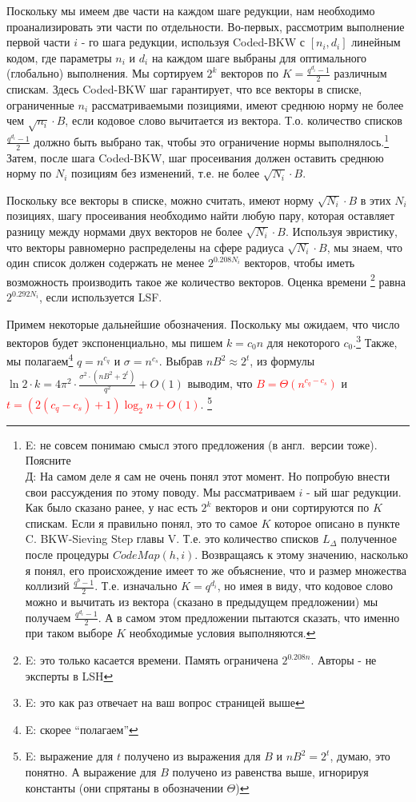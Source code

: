 \documentclass[a4paper,11pt]{article}
\begin{document}
Поскольку мы имеем две части на каждом шаге редукции, нам необходимо проанализировать эти части по отдельности. Во-первых, рассмотрим выполнение первой части $i$ - го шага редукции, используя Coded-BKW с $[n_i,d_i]$ линейным кодом, где параметры $n_i$ и $d_i$ на каждом шаге выбраны для оптимального (глобально) выполнения. Мы сортируем $2^k$ векторов по $K=\frac{q^{d_i} - 1}{2}$ различным спискам. Здесь Coded-BKW шаг гарантирует, что все векторы в списке, ограниченные $n_i$ рассматриваемыми позициями, имеют среднюю норму не более чем $\sqrt{n_i}\cdot B$, если кодовое слово вычитается из вектора. Т.о. количество списков $\frac{q^{d_i} - 1}{2}$ должно быть выбрано так, чтобы это ограничение нормы выполнялось.\footnote{E: не совсем понимаю смысл этого предложения (в англ.\ версии тоже). Поясните \\ Д: На самом деле я сам не очень понял этот момент. Но попробую внести свои рассуждения по этому поводу. Мы рассматриваем $i$ - ый шаг редукции. Как было сказано ранее, у нас есть $2^k$ векторов и они сортируются по $K$ спискам. Если я правильно понял, это то самое $K$ которое описано в пункте C. BKW-Sieving Step главы V. Т.е. это количество списков $L_{\Delta}$ полученное после процедуры $CodeMap(h,i)$. Возвращаясь к этому значению, насколько я понял, его происхождение имеет то же объяснение, что и размер множества коллизий $\frac{q^b-1}{2}$. Т.е. изначально $K=q^{d_i}$, но имея в виду, что кодовое слово можно и вычитать из вектора (сказано в предыдущем предложении) мы получаем $\frac{q^{d_i}-1}{2}$. А в самом этом предложении пытаются сказать, что именно при таком выборе $K$ необходимые условия выполняются.} Затем, после шага Coded-BKW, шаг просеивания должен оставить среднюю норму по $N_i$ позициям без изменений, т.е. не более $\sqrt{N_i}\cdot B$.

Поскольку все векторы в списке, можно считать, имеют норму $\sqrt{N_i}\cdot B$ в этих $N_i$ позициях, шагу просеивания необходимо найти любую пару, которая оставляет разницу между нормами двух векторов не более $\sqrt{N_i}\cdot B$. Используя эвристику, что векторы равномерно распределены на сфере радиуса $\sqrt{N_i}\cdot B$, мы знаем, что один список должен содержать не менее $2^{0.208N_i }$ векторов, чтобы иметь возможность производить такое же количество векторов. Оценка времени \footnote{E: это только касается времени. Память ограничена $2^{0.208n }$. Авторы - не эксперты в LSH} равна $2^{0.292N_i}$, если используется LSF.

Примем некоторые дальнейшие обозначения. Поскольку мы ожидаем, что число векторов будет экспоненциально, мы пишем $k=c_0n$ для некоторого $c_0$.\footnote{E: это как раз отвечает на ваш вопрос страницей выше} Также, мы полагаем\footnote{E: скорее ``полагаем''} $q=n^{c_q}$ и $\sigma=n^{c_s}$. Выбрав $nB^2\approx2^t$, из формулы $\ln{2} \cdot k = 4\pi^2 \cdot \frac{\sigma^2 \cdot (nB^2+2^t)}{q^2} + O(1)$ выводим, что \textcolor{red}{$B=\Theta(n^{c_q-c_s})$} и \textcolor{red}{$t=(2(c_q-c_s)+1)\log_2 n + O(1)$}. \footnote{E: выражение для $t$ получено из выражения для $B$ и $nB^2 = 2^t$, думаю, это понятно. А выражение для $B$ получено из равенства выше, игнорируя константы (они спрятаны в обозначении $\Theta$)}
\end{document}
